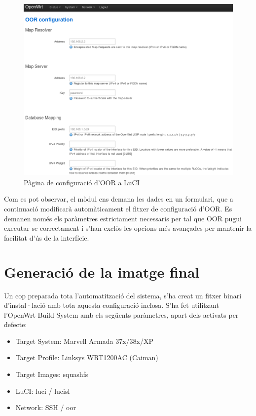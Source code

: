 \documentclass[11pt]{article}
\begin{document}
	\begin{figure}[h]
		\centering
		\includegraphics[width=15cm]{luci2}
		\caption{Pàgina de configuració d'OOR a LuCI}
	\end{figure}	

Com es pot observar, el mòdul ens demana les dades en un formulari, que a continuació modificarà automàticament el fitxer de configuració d’OOR. Es demanen només els paràmetres estrictament necessaris per tal que OOR pugui executar-se correctament i s'han exclòs les opcions més avançades per mantenir la facilitat d'ús de la interfície.
\newpage
\section{Generació de la imatge final}
Un cop preparada tota l’automatització del sistema, s’ha creat un fitxer binari d’instal·lació amb tota aquesta configuració inclosa. S’ha fet utilitzant l’OpenWrt Build System amb els següents paràmetres, apart dels activats per defecte:
\begin{itemize}
\item Target System: Marvell Armada 37x/38x/XP
\item Target Profile: Linksys WRT1200AC (Caiman)
\item Target Images: squashfs
\item LuCI: luci / lucisl
\item Network: SSH / oor
\end{itemize}
\end{document}
